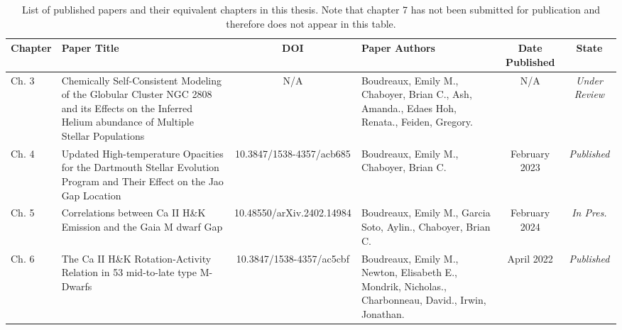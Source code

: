\begin{table}
\centering
\scriptsize
  \begin{tabular}{l p{3cm} c p{2cm} c c}
    \hline
    \rowcolor{gray!50}
    Chapter & Paper Title & DOI & Paper Authors & Date Published & State\\
    \hline
    \hline
    Ch. 3 & Chemically Self-Consistent Modeling of the Globular Cluster NGC 2808 and its Effects on the Inferred Helium abundance of Multiple Stellar Populations & N/A & Boudreaux, Emily M., Chaboyer, Brian C., Ash, Amanda., Edaes Hoh, Renata., Feiden, Gregory.& N/A & {\em Under Review} \\
    \rowcolor{gray!25}
    Ch. 4 & Updated High-temperature Opacities for the Dartmouth Stellar Evolution Program and Their Effect on the Jao Gap Location & 10.3847/1538-4357/acb685 & Boudreaux, Emily M., Chaboyer, Brian C. & February 2023 & {\em Published} \\
    Ch. 5 & Correlations between Ca II H\&K Emission and the Gaia M dwarf Gap & 10.48550/arXiv.2402.14984 & Boudreaux, Emily M., Garcia Soto, Aylin., Chaboyer, Brian C. & February 2024 & {\em In Pres.} \\
    \rowcolor{gray!25}
    Ch. 6 & The Ca II H\&K Rotation-Activity Relation in 53 mid-to-late type M-Dwarfs & 10.3847/1538-4357/ac5cbf & Boudreaux, Emily M., Newton, Elisabeth E., Mondrik, Nicholas., Charbonneau, David., Irwin, Jonathan. & April 2022 & {\em Published}
  \end{tabular}
  \caption{List of published papers and their equivalent chapters in this thesis. Note that chapter 7 has not been submitted for publication and therefore does not appear in this table.}
  \label{tab:publications}
\end{table}
